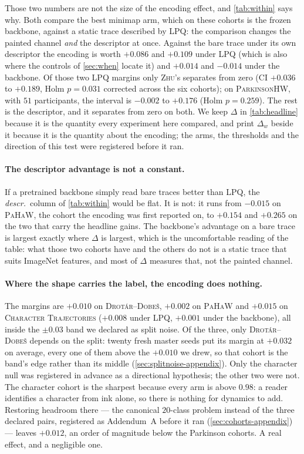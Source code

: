 \documentclass{article}
\begin{document}
Those two numbers are not the size of the encoding effect, and \cref{tab:within} says why. Both
compare the best minimap arm, which on these cohorts is the frozen backbone, against a static trace
described by LPQ: the comparison changes the painted channel \emph{and} the descriptor at once.
Against the bare trace under its own descriptor the encoding is worth $+0.086$ and $+0.109$ under
LPQ (which is also where the controls of \cref{sec:when} locate it) and $+0.014$ and $-0.014$
under the backbone. Of those two LPQ margins only \textsc{Zhu}'s separates from zero (CI $+0.036$ to
$+0.189$, Holm $p = 0.031$ corrected across the six cohorts); on \textsc{ParkinsonHW}, with $51$
participants, the interval is $-0.002$ to $+0.176$ (Holm $p = 0.259$). The rest is the descriptor, and it separates from zero on
both. We keep $\Delta$ in \cref{tab:headline} because it is the quantity every experiment here
compared, and print $\Delta_w$ beside it because it is the quantity about the encoding; the arms,
the thresholds and the direction of this test were registered before it ran.

\paragraph{The descriptor advantage is not a constant.} If a pretrained backbone simply read bare
traces better than LPQ, the \emph{descr.}\ column of \cref{tab:within} would be flat. It is not: it
runs from $-0.015$ on \textsc{PaHaW}, the cohort the encoding was first reported on, to $+0.154$ and
$+0.265$ on the two that carry the headline gains. The backbone's advantage on a bare trace is
largest exactly where $\Delta$ is largest, which is
the uncomfortable reading of the table: what those two cohorts have and the others do not is a
static trace that suits ImageNet features, and most of $\Delta$ measures that, not the painted
channel.

\paragraph{Where the shape carries the label, the encoding does nothing.} The margins are
$+0.010$ on \textsc{Drot\'ar--Dobe\v{s}}, $+0.002$ on \textsc{PaHaW} and $+0.015$ on
\textsc{Character Trajectories} ($+0.008$ under LPQ, $+0.001$ under the backbone), all inside the
$\pm 0.03$ band we declared as split noise. Of the three, only
\textsc{Drot\'ar--Dobe\v{s}} depends on the split: twenty fresh master seeds put its margin at
$+0.032$ on average, every one of them above the $+0.010$ we drew, so that cohort is the band's
edge rather than its middle (\cref{sec:splitnoise-appendix}). Only the character null was
registered in advance as a directional hypothesis; the other two were not. The character cohort is
the sharpest because every arm is above $0.98$: a reader identifies a character from ink alone, so
there is nothing for dynamics to add. Restoring headroom there --- the canonical $20$-class problem
instead of the three declared pairs, registered as Addendum~A before it ran
(\cref{sec:cohorts-appendix}) --- leaves $+0.012$, an order of magnitude below the Parkinson
cohorts. A real effect, and a negligible one.
\end{document}
